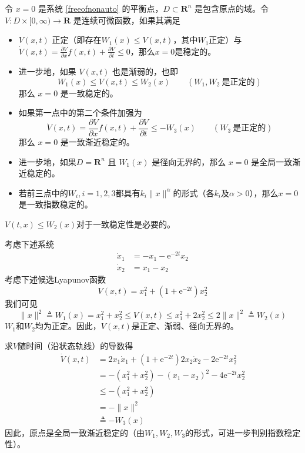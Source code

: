 \begin{theorem}[时变系统的Lyapunov稳定性定理]
  令 $x = 0$ 是系统 \eqref{freeofnonauto} 的平衡点，$D \subset
  \mathbf{R}^n$ 是包含原点的域。令 $V: D \times [0, \infty) \rightarrow \mathbf{R}$
  是连续可微函数，如果其满足
  \begin{itemize}[leftmargin=1em]
    \item $V (x, t)$ 正定（即存在$W_1 (x) \leq V (x, t)$，其中$W_1$正定）与
    $\dot{V} (x, t) = \frac{\partial V}{\partial x} f (x, t) + \frac{\partial V}{\partial t} \leq 0$，那么$x=0$是稳定的。
    
    \item 进一步地，如果 $V (x, t)$ 也是渐弱的，也即
    \[ W_1 (x) \leq V (x, t) \leq W_2 (x) \qquad (W_1, W_2 \ \text{是正定的}) \]
    那么 $x = 0$ 是一致稳定的。
    
    \item 如果第一点中的第二个条件加强为
    \[ \dot{V} (x, t) = \frac{\partial V}{\partial x} f (x, t) + \frac{\partial
       V}{\partial t} \leq - W_3 (x) \qquad (W_3 \ \text{是正定的}) \]
    那么 $x = 0$ 是一致渐近稳定的。
    
    \item 进一步地，如果$D=\mathbf{R}^n$ 且 $W_1 (x)$ 是径向无界的，那么 $x = 0$ 是全局一致渐近稳定的。

    \item 若前三点中的$W_i,i=1,2,3$都具有$k_i \| x \|^\alpha $的形式（各$k_i$及$\alpha> 0$），那么$x = 0$ 是一致指数稳定的。
  \end{itemize}
\end{theorem}
\begin{note}
  $V(t,x)\le W_2(x)$对于一致稳定性是必要的。
\end{note}
\begin{example}
  考虑下述系统
  \begin{align*}
    \dot{x}_1 & = - x_1 - \mathrm{e}^{- 2 t} x_2\\
    \dot{x}_2 & = x_1 - x_2
  \end{align*}
  考虑下述候选Lyapunov函数
  \[ V (x, t) = x^2_1 + (1 + \mathrm{e}^{- 2 t}) x^2_2 \]
  我们可见
  \[ \| x \|^2 \triangleq W_1 (x) = x^2_1 + x^2_2 \leq V (x, t) \leq x^2_1 + 2
     x^2_2  \leq 2 \| x \|^2 \triangleq W_2 (x) \]
  $W_1$和$W_2$均为正定。因此，$V (x, t)$是正定、渐弱、径向无界的。
  
  求$V$随时间（沿状态轨线）的导数得
  \begin{align*}
    \dot{V} (x, t) & =  2 x_1 \dot{ x}_1 + (1 + \mathrm{e}^{- 2 t}) 2 x_2 \dot{x}_2 -
    2 \mathrm{e}^{- 2 t} x^2_2\\
    & =  - (x^2_1 + x^2_2) - (x_1 - x_2)^2 - 4 \mathrm{e}^{- 2 t} x^2_2\\
    & \leq  - (x^2_1 + x^2_2)\\
    &  = - \| x \|^2\\
    &\triangleq  - W_3 (x)
  \end{align*}
  因此，原点是全局一致渐近稳定的（由$W_1,W_2,W_3$的形式，可进一步判别指数稳定性）。
\end{example}